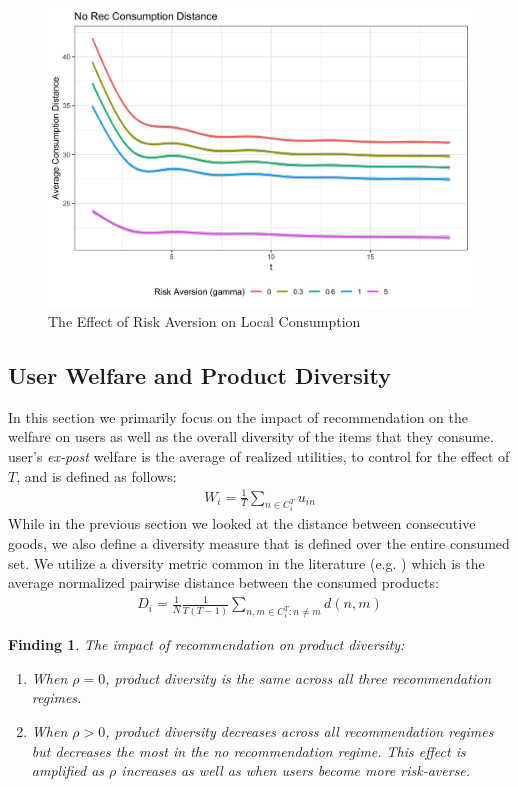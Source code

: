 \documentclass[sigconf]{acmart}
\newtheorem{finding}{Finding}
\begin{document}
\begin{figure}
\includegraphics[scale=0.1]{figures/consumption_dist_N_200T_20_no_rec_alpha}
\caption{The Effect of Risk Aversion on Local Consumption}
\label{fig:no_rec_risk_aversion}
\end{figure}

\subsection{User Welfare and Product Diversity}

In this section we primarily focus on the impact of recommendation on the welfare on users as well as the overall diversity of the items that they consume.
user's \textit{ex-post} welfare is the average of realized utilities, to control for the effect of $T$, and is defined as follows:
\begin{align*}
W_i=\frac{1}{T}\sum_{n \in C_i^T} u_{in}
\end{align*}
While in the previous section we looked at the distance between consecutive goods, we also define a diversity measure that is defined over the entire consumed set. We utilize a diversity metric common in the literature (e.g. \cite{ziegler2005improving}) which is the average normalized pairwise distance between the consumed products:
\begin{align*}
D_i =\frac{1}{N} \frac{1}{T (T-1)}\sum_{n,m \in C_i^T: n \ne m} d(n,m)
\end{align*}

\begin{finding}\label{finding_diversity}
The impact of recommendation on product diversity:
\begin{enumerate}
\item When $\rho = 0$, product diversity is the same across all three recommendation regimes.
\item When $\rho > 0$, product diversity decreases across all recommendation regimes but decreases the most in the no recommendation regime. This effect is amplified as $\rho$ increases as well as when users become more risk-averse.
\end{enumerate}
\end{finding}
\end{document}
